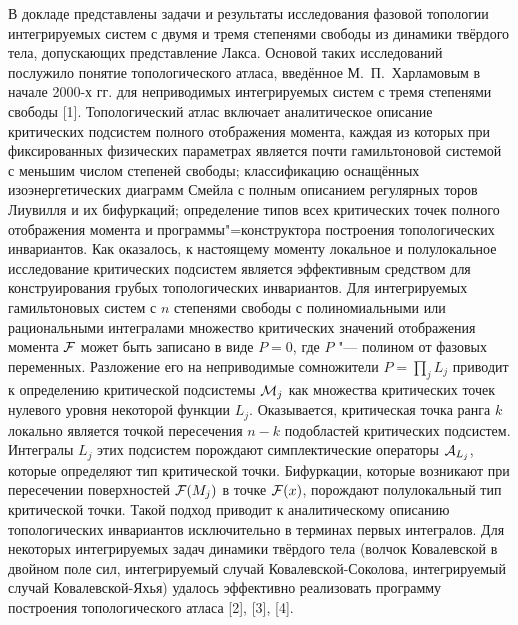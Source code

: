 \vzmscaption


В докладе представлены задачи и результаты исследования фазовой топологии интегрируемых систем с двумя и тремя степенями свободы из динамики твёрдого тела, допускающих представление Лакса. Основой таких исследований послужило понятие топологического атласа, введённое М.~П.~Харламовым в начале 2000-х гг. для неприводимых интегрируемых систем с тремя степенями свободы [1]. Топологический атлас включает аналитическое описание критических подсистем полного отображения момента, каждая из которых при фиксированных физических параметрах является почти гамильтоновой системой с меньшим числом степеней свободы; классификацию оснащённых изоэнергетических диаграмм Смейла с полным описанием регулярных торов Лиувилля и их бифуркаций; определение типов всех критических точек полного отображения момента и программы"=конструктора построения топологических инвариантов. Как оказалось, к настоящему моменту локальное и полулокальное исследование критических подсистем является эффективным средством для конструирования грубых топологических инвариантов. Для интегрируемых гамильтоновых систем с $n$ степенями свободы с полиномиальными или рациональными интегралами множество критических значений отображения момента $\cal F$ может быть записано в виде $P=0$, где $P$ "--- полином от фазовых переменных. Разложение его на неприводимые сомножители $P=\prod\nolimits_j {L_j}$ приводит к определению критической подсистемы ${\cal M}_j$ как множества критических точек нулевого уровня некоторой функции $L_j$. Оказывается, критическая точка ранга $k$ локально является точкой пересечения $n-k$ подобластей критических подсистем. Интегралы $L_j$ этих подсистем порождают симплектические операторы ${\cal A}_{L_j}$, которые определяют тип критической точки. Бифуркации, которые возникают при пересечении поверхностей ${\cal F}(M_j)$ в точке
${\cal F}(x)$, порождают полулокальный тип критической точки. Такой подход приводит к аналитическому описанию топологических инвариантов исключительно в терминах первых интегралов. Для некоторых интегрируемых задач динамики твёрдого тела (волчок Ковалевской в двойном поле сил, интегрируемый случай Ковалевской-Соколова, интегрируемый случай Ковалевской-Яхья) удалось эффективно реализовать программу построения топологического атласа [2], [3], [4].


